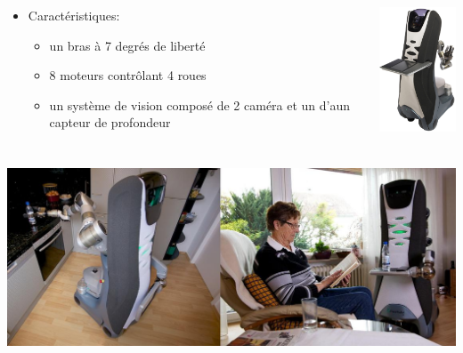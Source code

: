 \begin{frame}
	\frametitle{}
	\begin{columns}[T]
		\begin{column}{.5\textwidth}
			\begin{itemize}
			\item Caractéristiques:
				\begin{itemize}
				\item un bras à 7 degrés de liberté
				\item 8 moteurs contrôlant 4 roues
				\item un système de vision composé de
                                  2 caméra et un d'aun capteur de
                                  profondeur
				\end{itemize}
			\end{itemize}
		\end{column}
   		\begin{column}{.5\textwidth}
			\includegraphics[width=3cm]{./image/Care_o_bot_3.jpg}
   		\end{column}
	\end{columns}
\end{frame}

\begin{frame}
	\frametitle{}
	\includegraphics[scale = 0.36]{./image/Fetch_and_Carry2.JPG}
\end{frame}

